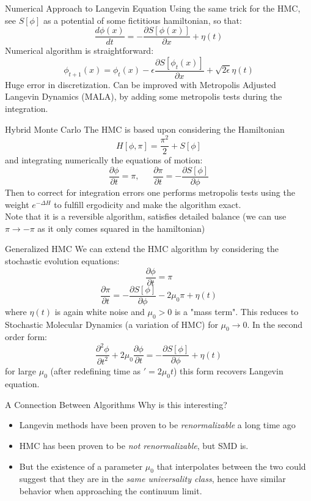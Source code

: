 \documentclass[10pt]{beamer}
\begin{document}
\begin{frame}{Numerical Approach to Langevin Equation}
    Using the same trick for the HMC, see $S[\phi]$ as a potential of some fictitious hamiltonian, so that:
    \[
        \frac{d\phi(x)}{dt} = -\frac{\partial S[\phi(x)]}{\partial x} + \eta(t)
    \]
    Numerical algorithm is straightforward:
    \[
        \phi_{t+1}(x) = \phi_t(x) - \epsilon \frac{\partial S[\phi_t(x)]}{\partial x} + \sqrt{2\epsilon}\eta(t)
    \]
    Huge error in discretization. Can be improved with Metropolis Adjusted Langevin Dynamics (MALA), by adding some metropolis tests during the integration.
    
\end{frame}

\begin{frame}{Hybrid Monte Carlo}
    The HMC is based upon considering the Hamiltonian
    \[
        H[\phi,\pi] = \frac{\pi^2}{2} + S[\phi]
    \]
    and integrating numerically the equations of motion:
    \[
        \frac{\partial \phi}{\partial t } = \pi, ~~~~~~~ \frac{\partial \pi}{\partial t } = -\frac{\partial S[\phi]}{\partial \phi}
    \]
    Then to correct for integration errors one performs metropolis tests using the weight $e^{-\Delta H}$ to fulfill ergodicity and make the algorithm exact.\\
    Note that it is a reversible algorithm, satisfies detailed balance (we can use $\pi \rightarrow - \pi$ as it only comes squared in the hamiltonian)
\end{frame}

\begin{frame}{Generalized HMC}
    We can extend the HMC algorithm by considering the stochastic evolution equations:
    \[
        \frac{\partial \phi}{\partial t } = \pi
    \]
    \[
        \frac{\partial \pi}{\partial t } = -\frac{\partial S[\phi]}{\partial \phi} - 2\mu_0\pi + \eta(t)
    \]
    where $\eta(t)$ is again white noise and $\mu_0 > 0$ is a "mass term". This reduces to Stochastic Molecular Dynamics (a variation of HMC) for $\mu_0 \rightarrow 0$. In the second order form:
    \[
        \frac{\partial^2 \phi}{\partial t^2 } + 2\mu_0\frac{\partial \phi}{\partial t} = -\frac{\partial S[\phi]}{\partial \phi}  + \eta(t)
    \]
    for large $\mu_0$ (after redefining time as $'=2\mu_0t$) this form recovers Langevin equation.
\end{frame}

\begin{frame}{A Connection Between Algorithms}
    Why is this interesting? \\
    \begin{itemize}
        \item Langevin methods have been proven to be \textit{renormalizable} a long time ago
        \item HMC has been proven to be \textit{not renormalizable}, but SMD is.
        \item But the existence of a parameter $\mu_0$ that interpolates between the two could suggest that they are in the \textit{same universality class}, hence have similar behavior when approaching the continuum limit. 
    \end{itemize}
\end{frame}
\end{document}
